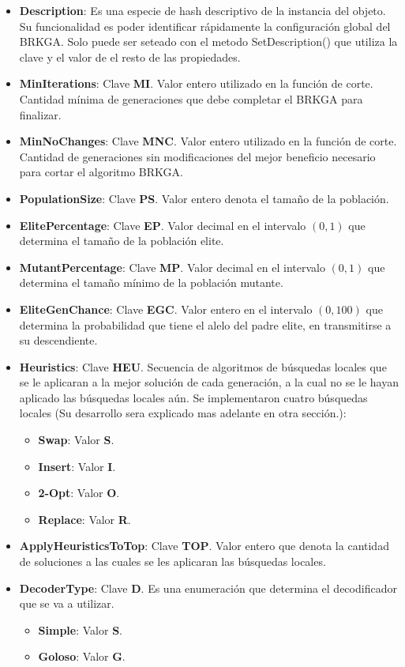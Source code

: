 \begin{itemize}
  \item \textbf{Description}: Es una especie de hash descriptivo de la instancia del objeto. Su funcionalidad es poder identificar rápidamente la configuración global del BRKGA. Solo puede ser seteado con el metodo SetDescription() que utiliza la clave y el valor de el resto de las propiedades.
  \item \textbf{MinIterations}: Clave \textbf{MI}. Valor entero utilizado en la función de corte. Cantidad mínima de generaciones que debe completar el BRKGA para finalizar. 
  \item \textbf{MinNoChanges}: Clave \textbf{MNC}. Valor entero utilizado en la función de corte. Cantidad de generaciones sin modificaciones del mejor beneficio necesario para cortar el algoritmo BRKGA.
  \item \textbf{PopulationSize}: Clave \textbf{PS}. Valor entero denota el tamaño de la población.
  \item \textbf{ElitePercentage}: Clave \textbf{EP}. Valor decimal en el intervalo $(0, 1)$ que determina el tamaño de la población elite. 
  \item \textbf{MutantPercentage}: Clave \textbf{MP}. Valor decimal en el intervalo $(0, 1)$ que determina el tamaño mínimo de la población mutante. 
  \item \textbf{EliteGenChance}: Clave \textbf{EGC}. Valor entero en el intervalo $(0, 100)$ que determina la probabilidad que tiene el alelo del padre elite, en transmitirse a su descendiente. 
  \item \textbf{Heuristics}: Clave \textbf{HEU}. Secuencia de algoritmos de búsquedas locales que se le aplicaran a la mejor solución de cada generación, a la cual no se le hayan aplicado las búsquedas locales aún. Se implementaron cuatro búsquedas locales (Su desarrollo sera explicado mas adelante en otra sección.):
	\begin{itemize}
		\item \textbf{Swap}: Valor \textbf{S}.
		\item \textbf{Insert}: Valor \textbf{I}.
		\item \textbf{2-Opt}: Valor \textbf{O}.
		\item \textbf{Replace}: Valor \textbf{R}.
	\end{itemize}  
  \item \textbf{ApplyHeuristicsToTop}: Clave \textbf{TOP}. Valor entero que denota la cantidad de soluciones a las cuales se les aplicaran las búsquedas locales.
  \item \textbf{DecoderType}: Clave \textbf{D}. Es una enumeración que determina el decodificador que se va a utilizar.
	\begin{itemize}
		\item \textbf{Simple}: Valor \textbf{S}.
		\item \textbf{Goloso}: Valor \textbf{G}.
	\end{itemize}  
\end{itemize}

